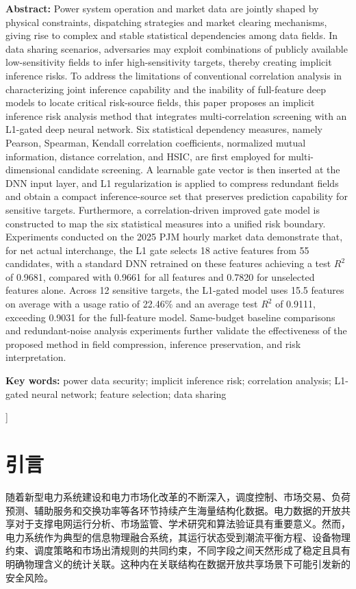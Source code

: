\documentclass[UTF8,zihao=5,twoside]{ctexart}
\numberwithin{equation}{section}
\newcommand{\fundcn}{基金项目：无。}
\newcommand{\funden}{Foundation item: None.}
\begin{document}
\noindent\textbf{Abstract:} Power system operation and market data are jointly shaped by physical constraints, dispatching strategies and market clearing mechanisms, giving rise to complex and stable statistical dependencies among data fields. In data sharing scenarios, adversaries may exploit combinations of publicly available low-sensitivity fields to infer high-sensitivity targets, thereby creating implicit inference risks. To address the limitations of conventional correlation analysis in characterizing joint inference capability and the inability of full-feature deep models to locate critical risk-source fields, this paper proposes an implicit inference risk analysis method that integrates multi-correlation screening with an L1-gated deep neural network. Six statistical dependency measures, namely Pearson, Spearman, Kendall correlation coefficients, normalized mutual information, distance correlation, and HSIC, are first employed for multi-dimensional candidate screening. A learnable gate vector is then inserted at the DNN input layer, and L1 regularization is applied to compress redundant fields and obtain a compact inference-source set that preserves prediction capability for sensitive targets. Furthermore, a correlation-driven improved gate model is constructed to map the six statistical measures into a unified risk boundary. Experiments conducted on the 2025 PJM hourly market data demonstrate that, for net actual interchange, the L1 gate selects 18 active features from 55 candidates, with a standard DNN retrained on these features achieving a test $R^2$ of 0.9681, compared with 0.9661 for all features and 0.7820 for unselected features alone. Across 12 sensitive targets, the L1-gated model uses 15.5 features on average with a usage ratio of 22.46\% and an average test $R^2$ of 0.9111, exceeding 0.9031 for the full-feature model. Same-budget baseline comparisons and redundant-noise analysis experiments further validate the effectiveness of the proposed method in field compression, inference preservation, and risk interpretation.\par
\noindent\textbf{Key words:} power data security; implicit inference risk; correlation analysis; L1-gated neural network; feature selection; data sharing\par\vspace{0.8em}

\noindent{\small\fundcn\\\funden}
\vspace{0.8em}
]

\section{引言}
随着新型电力系统建设和电力市场化改革的不断深入，调度控制、市场交易、负荷预测、辅助服务和交换功率等各环节持续产生海量结构化数据\cite{ref-liu-cps,ref-ma-pjm}。电力数据的开放共享对于支撑电网运行分析、市场监管、学术研究和算法验证具有重要意义\cite{ref-fan-pjm}。然而，电力系统作为典型的信息物理融合系统，其运行状态受到潮流平衡方程、设备物理约束、调度策略和市场出清规则的共同约束，不同字段之间天然形成了稳定且具有明确物理含义的统计关联。这种内在关联结构在数据开放共享场景下可能引发新的安全风险。
\end{document}
